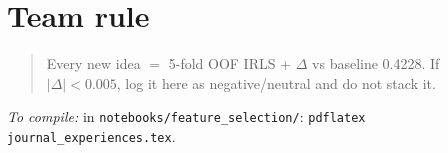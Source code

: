 \documentclass[11pt,a4paper]{article}
\begin{document}
\section{Team rule}
\begin{quote}
Every new idea $=$ 5-fold OOF IRLS + $\Delta$ vs baseline 0.4228.
If $|\Delta|<0.005$, log it here as negative/neutral and do not stack it.
\end{quote}

\noindent\textit{To compile:} in \texttt{notebooks/feature\_selection/}:
\texttt{pdflatex journal\_experiences.tex}.
\end{document}
